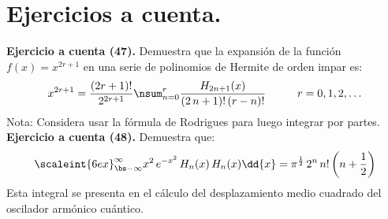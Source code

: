 \newpage

\section{Ejercicios a cuenta.}

\noindent
\textbf{Ejercicio a cuenta (47). } Demuestra que la expansión de la función \break \hfill $f(x) =x^{2 r + 1}$ en una serie de polinomios de Hermite de orden impar es:
\begin{align*}
x^{2 r +1} = \dfrac{(2 r + 1)!}{2^{2 r +1}} \nsum_{n=0}^{r} \dfrac{H_{2n+1}(x)}{(2 \, n + 1)! \, (r - n)!} \hspace{1cm} r = 0, 1, 2, \ldots
\end{align*}
Nota: Considera usar la fórmula de Rodrigues para luego integrar por partes.
\\[0.5em]
\noindent
\textbf{Ejercicio a cuenta (48). } Demuestra que:
\begin{align*}
\scaleint{6ex}_{\bs - \infty}^{\infty} x^{2} \, e^{-x^{2}} \, H_{n}(x) \, H_{n}(x) \dd{x} = \pi^{\frac{1}{2}} \, 2^{n} \, n! \, \bigg( n + \dfrac{1}{2} \bigg)
\end{align*}
Esta integral se presenta en el cálculo del desplazamiento medio cuadrado del oscilador armónico cuántico.
